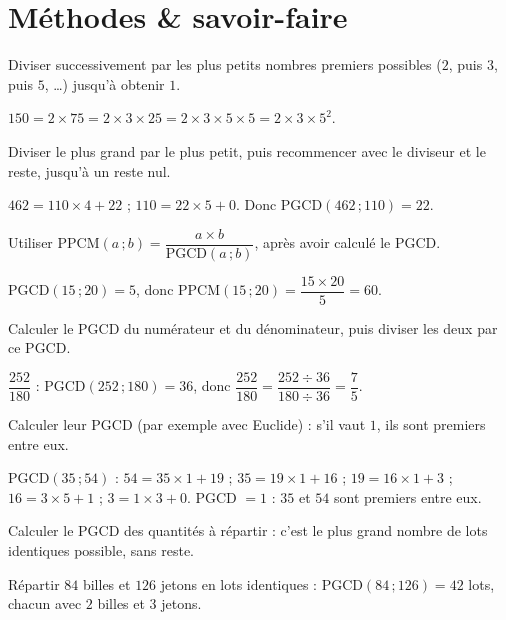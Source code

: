 \section{Méthodes \& savoir-faire}

Diviser successivement par les plus petits nombres premiers possibles ($2$, puis $3$, puis
$5$, \ldots) jusqu'à obtenir $1$.
\begin{exemple}
$150=2\times75=2\times3\times25=2\times3\times5\times5=2\times3\times5^{2}$.
\end{exemple}

Diviser le plus grand par le plus petit, puis recommencer avec le diviseur et le reste,
jusqu'à un reste nul.
\begin{exemple}
$462=110\times4+22$ ; $110=22\times5+0$. Donc $\text{PGCD}(462\,;110)=22$.
\end{exemple}

Utiliser $\text{PPCM}(a\,;b)=\dfrac{a\times b}{\text{PGCD}(a\,;b)}$, après avoir calculé le
PGCD.
\begin{exemple}
$\text{PGCD}(15\,;20)=5$, donc $\text{PPCM}(15\,;20)=\dfrac{15\times20}5=60$.
\end{exemple}

Calculer le PGCD du numérateur et du dénominateur, puis diviser les deux par ce PGCD.
\begin{exemple}
$\dfrac{252}{180}$ : $\text{PGCD}(252\,;180)=36$, donc
$\dfrac{252}{180}=\dfrac{252\div36}{180\div36}=\dfrac75$.
\end{exemple}

Calculer leur PGCD (par exemple avec Euclide) : s'il vaut $1$, ils sont premiers entre eux.
\begin{exemple}
$\text{PGCD}(35\,;54)$ : $54=35\times1+19$ ; $35=19\times1+16$ ; $19=16\times1+3$ ;
$16=3\times5+1$ ; $3=1\times3+0$. PGCD $=1$ : $35$ et $54$ sont premiers entre eux.
\end{exemple}

Calculer le PGCD des quantités à répartir : c'est le plus grand nombre de lots identiques
possible, sans reste.
\begin{exemple}
Répartir $84$ billes et $126$ jetons en lots identiques : $\text{PGCD}(84\,;126)=42$
lots, chacun avec $2$ billes et $3$ jetons.
\end{exemple}

